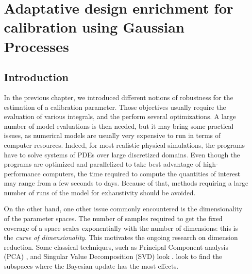 \documentclass[../../Main_ManuscritThese.tex]{subfiles}
\begin{document}
\chapter{Adaptative design enrichment for calibration using Gaussian Processes}
\label{chap:adaptative_design_gp}
\minitoc
\newpage
\subfileLocal{\pagestyle{contentStyle}}



\section{Introduction}

In the previous chapter, we introduced different notions of robustness for the estimation of a calibration parameter. Those objectives usually require the evaluation of various integrals, and the perform several optimizations. A large number of model evaluations is then needed, but it may bring some practical issues, as numerical models are usually very expensive to run in terms of computer resources. Indeed, for most realistic physical simulations, the programs have to solve systems of PDEs over large discretized domains. Even though the programs are optimized and parallelized to take best advantage of high-performance computers, the time required to compute the quantities of interest may range from a few seconds to days. Because of that, methods requiring a large number of runs of the model for exhaustivity should be avoided.

On the other hand, one other issue commonly encountered is the dimensionality of the parameter spaces. The number of samples required to get the fixed coverage of a space scales exponentially with the number of dimensions: this is the \emph{curse of dimensionality}. This motivates the ongoing research on dimension reduction. Some classical techniques, such as Principal Component analysis (PCA) \cite{jolliffe_principal_2002}, and Singular Value Decomposition (SVD) look . \cite{zahm_certified_2018} look to find the subspaces where the Bayesian update has the most effects.\cite{blanchet-scalliet_specific_2017,ribaud_krigeage_2018}

\end{document}
